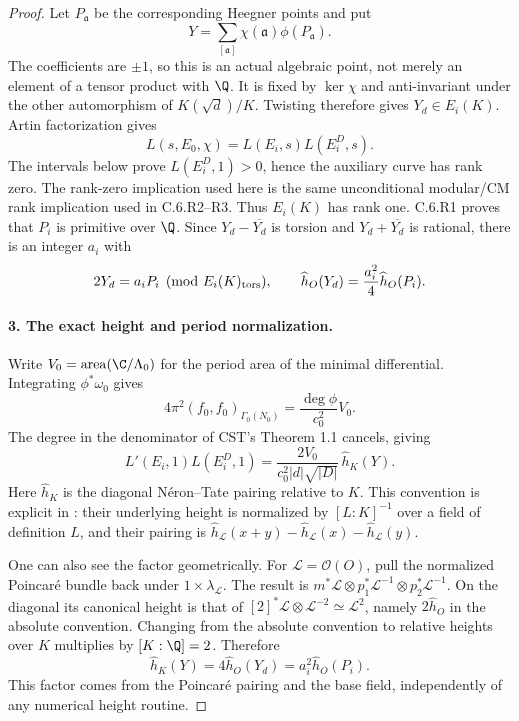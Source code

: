 \begin{proof}
Let $P_{\mathfrak a}$ be the corresponding Heegner points and put
\[
 Y=\sum_{[\mathfrak a]}\chi(\mathfrak a)\phi(P_{\mathfrak a}).
\]
The coefficients are $\pm1$, so this is an actual algebraic point,
not merely an element of a tensor product with $\Q$. It is fixed
by $\ker\chi$ and anti-invariant under the other automorphism of
$K(\sqrt d)/K$. Twisting therefore gives $Y_d\in E_i(K)$.
Artin factorization gives
\[
 L(s,E_0,\chi)=L(E_i,s)L(E_i^D,s).
\]
The intervals below prove $L(E_i^D,1)>0$, hence the auxiliary
curve has rank zero. The rank-zero implication used here is the
same unconditional modular/CM rank implication used in C.6.R2--R3.
Thus $E_i(K)$ has rank one. C.6.R1 proves that $P_i$ is primitive
over $\Q$. Since $Y_d-\overline{Y_d}$ is torsion and
$Y_d+\overline{Y_d}$ is rational, there is an integer $a_i$ with
\[
 2Y_d=a_iP_i\pmod{E_i(K)_{\rm tors}},\qquad
 \widehat h_O(Y_d)=\frac{a_i^2}{4}\widehat h_O(P_i).
\]

\paragraph{3. The exact height and period normalization.}
Write $V_0=\operatorname{area}(\C/\Lambda_0)$ for the period area
of the minimal differential. Integrating $\phi^*\omega_0$ gives
\[
 4\pi^2(f_0,f_0)_{\Gamma_0(N_0)}
   =\frac{\deg\phi}{c_0^2}V_0.
\]
The degree in the denominator of CST's Theorem 1.1 cancels, giving
\begin{equation}\label{eq:Cgz-product}
 L'(E_i,1)L(E_i^D,1)
  =\frac{2V_0}{c_0^2|d|\sqrt{|D|}}\,\widehat h_K(Y).
\end{equation}
Here $\widehat h_K$ is the diagonal N\'eron--Tate pairing relative
to $K$. This convention is explicit in
\citet[\S7.1.1, pp.~218--219, Theorem 7.1.2]{CgzYZZ2011}:
their underlying height is normalized by $[L:K]^{-1}$ over a
field of definition $L$, and their pairing is
$\widehat h_{\mathcal L}(x+y)-\widehat h_{\mathcal L}(x)
-\widehat h_{\mathcal L}(y)$.

One can also see the factor geometrically. For
$\mathcal L=\mathcal O(O)$, pull the normalized Poincar\'e bundle
back under $1\times\lambda_{\mathcal L}$. The result is
$m^*\mathcal L\otimes p_1^*\mathcal L^{-1}\otimes
p_2^*\mathcal L^{-1}$. On the diagonal its canonical height is
that of $[2]^*\mathcal L\otimes\mathcal L^{-2}\simeq
\mathcal L^2$, namely $2\widehat h_O$ in the absolute convention.
Changing from the absolute convention to relative heights over
$K$ multiplies by $[K:\Q]=2$. Therefore
\[
 \widehat h_K(Y)=4\widehat h_O(Y_d)
                =a_i^2\widehat h_O(P_i).
\]
This factor comes from the Poincar\'e pairing and the base field,
independently of any numerical height routine.


\end{proof}
